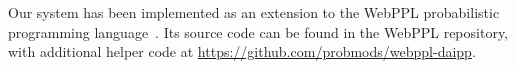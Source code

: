 
Our system has been implemented as an extension to the WebPPL probabilistic programming language~\cite{WebPPL}. Its source code can be found in the WebPPL repository, with additional helper code at \url{https://github.com/probmods/webppl-daipp}.